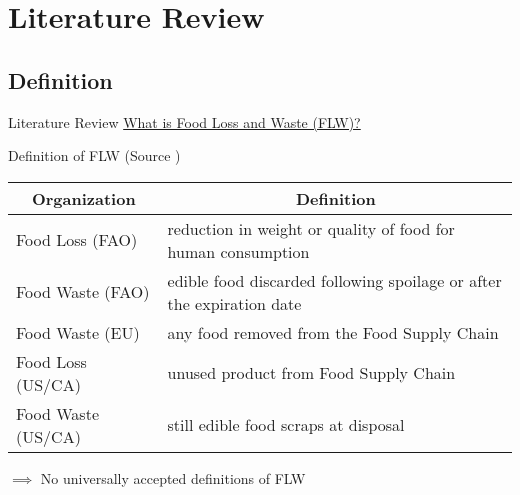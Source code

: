 \documentclass{beamer}\usepackage[]{graphicx}\usepackage[]{xcolor}
\begin{document}
\section{Literature Review}
\subsection{Definition}
\begin{frame}{Literature Review}
    \underline{What is Food Loss and Waste (FLW)?}
    \begin{block}{Definition of FLW (Source \cite{Ishangulyyev2019-uu})}
        \begin{table}[h]
            \begin{tabularx}{\textwidth}{l|X}
            \multicolumn{1}{c}{Organization} & \multicolumn{1}{c}{Definition} \\ \hline
                \small Food Loss (FAO)     
                & \footnotesize reduction in weight or quality of food for human consumption \\
                \small Food Waste (FAO)    
                & \footnotesize edible food discarded following spoilage or after the expiration date\\ \hline
                \small Food Waste (EU)     
                & \footnotesize any food removed from the Food Supply Chain    \\ \hline
                \small Food Loss (US/CA)   
                & \small unused product from Food Supply Chain \\
                \small Food Waste (US/CA)  
                & \footnotesize still edible food scraps at disposal\\ \hline
            \end{tabularx}
        \end{table}
    \end{block}
    $\implies$ No universally accepted definitions of FLW


\end{frame}
\end{document}
